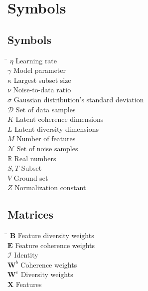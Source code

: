 \chapter*{Symbols}
\label{sec:symbols}


\section*{Symbols}

\begin{tabbing}
 \hspace*{1.6cm} \= \kill
 $\eta$ \> Learning rate \\ [0.5ex]
 $\gamma$ \> Model parameter \\ [0.5ex]
 $\kappa$ \> Largest subset size \\ [0.5ex]
 $\nu$ \> Noise-to-data ratio \\ [0.5ex]
 $\sigma$ \> Gaussian distribution's standard deviation \\ [0.5ex]
 $\mathcal{D}$ \> Set of data samples \\ [0.5ex]
 $K$ \> Latent coherence dimensions \\ [0.5ex]
 $L$ \> Latent diversity dimensions \\ [0.5ex]
 $M$ \> Number of features \\ [0.5ex]
 $\mathcal{N}$ \> Set of noise samples \\ [0.5ex]
 $\mathbb{R}$ \> Real numbers \\ [0.5ex]
 $S,T$ \> Subset \\ [0.5ex]
 $V$ \> Ground set \\ [0.5ex]
 $Z$ \> Normalization constant \\ [0.5ex]
\end{tabbing}

\section*{Matrices}

\begin{tabbing}
  \hspace*{1.6cm} \= \kill
  $\mathbf{B}$ \> Feature diversity weights \\ [0.5ex]
  $\mathbf{E}$ \> Feature coherence weights \\ [0.5ex]
  $\mathcal{I}$ \> Identity \\ [0.5ex]
  $\mathbf{W}^{b}$ \> Coherence weights \\ [0.5ex]
  $\mathbf{W}^{e}$ \> Diversity weights \\ [0.5ex]
  $\mathbf{X}$ \> Features \\ [0.5ex]
\end{tabbing}

